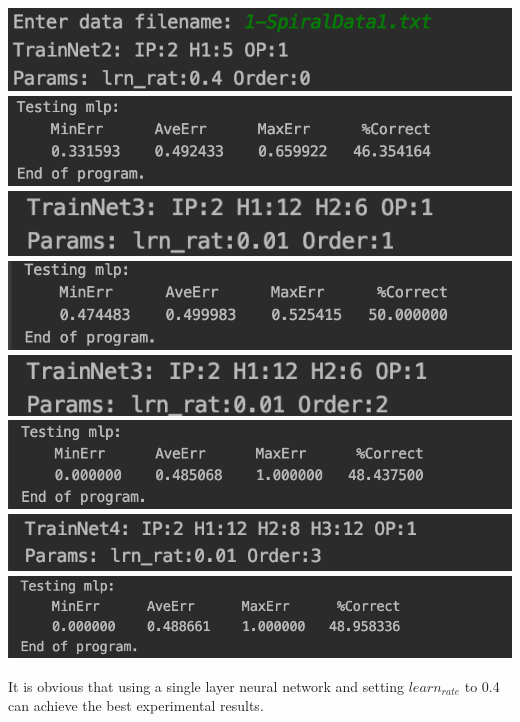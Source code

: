 \documentclass[11pt]{article}
\begin{document}
\includegraphics[scale=1]{1-in1.png}
\includegraphics[scale=0.8]{1-ot1.png}
\includegraphics[scale=1]{1-in2.png}
\includegraphics[scale=0.8]{1-ot2.png}
\includegraphics[scale=1]{1-in3.png}
\includegraphics[scale=0.8]{1-ot3.png}
\includegraphics[scale=1]{1-in4.png}
\includegraphics[scale=0.8]{1-ot4.png}

It is obvious that using a single layer neural network and setting $learn_{rate}$ to 0.4 can achieve the best experimental results.
\end{document}
